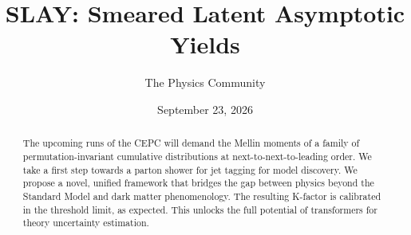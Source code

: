 \documentclass[11pt]{article}
\title{SLAY: Smeared Latent Asymptotic Yields}
\author{The Physics Community}
\date{September 23, 2026}
\begin{document}
\maketitle
\begin{abstract}
The upcoming runs of the CEPC will demand the Mellin moments of a family
of permutation-invariant cumulative distributions at
next-to-next-to-leading order. We take a first step towards a parton
shower for jet tagging for model discovery. We propose a novel, unified
framework that bridges the gap between physics beyond the Standard Model
and dark matter phenomenology. The resulting K-factor is calibrated in
the threshold limit, as expected. This unlocks the full potential of
transformers for theory uncertainty estimation.
\end{abstract}
\tableofcontents



\nocite{*}


\end{document}
